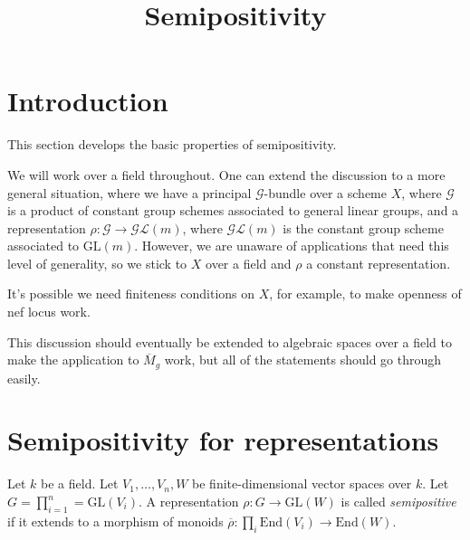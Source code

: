 


\newcommand{\todo}[1]{\footnote{\textbf{TODO.} #1}}


\title{Semipositivity}
\maketitle

\section{Introduction}
This section develops the basic properties of semipositivity.

\begin{remark}
We will work over a field throughout. One can extend the discussion to a more general situation, where we have a principal $\mathcal{G}$-bundle over a scheme $X$, where $\mathcal{G}$ is a product of constant group schemes associated to general linear groups, and a representation $\rho:\mathcal{G}\to\mathcal{GL}(m)$, where $\mathcal{GL}(m)$ is the constant group scheme associated to $\mathrm{GL}(m)$. However, we are unaware of applications that need this level of generality, so we stick to $X$ over a field and $\rho$ a constant representation.

It's possible we need finiteness conditions on $X$, for example, to make openness of nef locus work.
\end{remark}

\begin{remark}
This discussion should eventually be extended to algebraic spaces over a field to make the application to $\overline{M}_g$ work, but all of the statements should go through easily.
\end{remark}

\section{Semipositivity for representations}

\begin{definition}\label{semipos_rep_def}
Let $k$ be a field.
Let $V_1,\ldots,V_n,W$ be finite-dimensional vector spaces over $k$.
Let $G=\prod_{i=1}^{n}=\mathrm{GL}(V_i)$.
A representation $\rho:G\rightarrow \mathrm{GL}(W)$ is called \textit{semipositive} if it extends to a morphism of monoids $\overline{\rho}:\prod_i \mathrm{End}(V_i)\rightarrow\mathrm{End}(W)$.
\end{definition}

